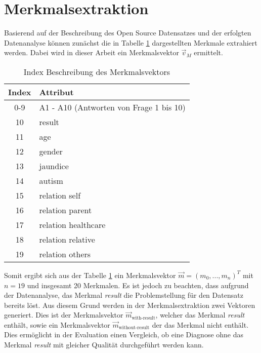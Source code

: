 \section{Merkmalsextraktion}
Basierend auf der Beschreibung des Open Source Datensatzes und der erfolgten Datenanalyse können zunächst die in Tabelle \ref{tbl:features} dargestellten Merkmale extrahiert werden. Dabei wird in dieser Arbeit ein Merkmalsvektor $\vec{v}_M$ ermittelt.

\begin{table}
\caption{Index Beschreibung des Merkmalsvektors}
\begin{tabular}{c p{5cm}}
\textbf{Index} & \textbf{Attribut} \\ \hline
0-9 & A1 - A10 (Antworten von Frage 1 bis 10)\\
10 & result\\
11 & age \\
12 & gender\\
13 & jaundice\\
14 & autism\\
15 & relation self\\
16 & relation parent\\
17 & relation healthcare\\
18 & relation relative\\
19 & relation others\\
\end{tabular}
\centering
\label{tbl:features}
\end{table}

Somit ergibt sich aus der Tabelle \ref{tbl:features} ein Merkmalsvektor $\vec{m} = (m_0, ..., m_n)^T$ mit $n = 19$ und insgesamt 20 Merkmalen. Es ist jedoch zu beachten, dass aufgrund der Datenanalyse, das Merkmal \textit{result} die Problemstellung für den Datensatz bereits löst. Aus diesem Grund werden in der Merkmalsextraktion zwei Vektoren generiert. Dies ist der Merkmalsvektor $\vec{m}_{\text{with-result}}$, welcher das Merkmal \textit{result} enthält, sowie ein Merkmalsvektor $\vec{m}_{\text{without-result}}$ der das Merkmal nicht enthält. Dies ermöglicht in der Evaluation einen Vergleich, ob eine Diagnose ohne das Merkmal \textit{result} mit gleicher Qualität durchgeführt werden kann.
